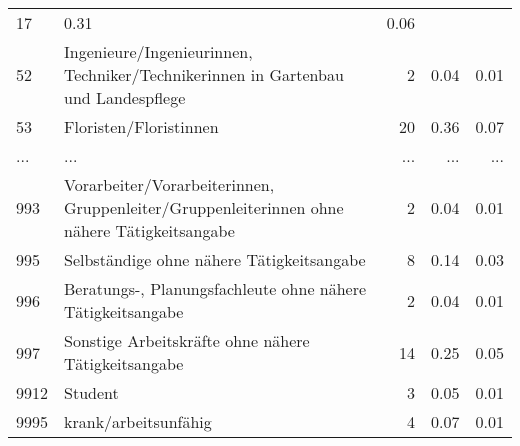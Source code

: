 \begin{longtable}{lXrrr}
          \num{17} &
          \num[round-mode=places,round-precision=2]{0.31} &
          \num[round-mode=places,round-precision=2]{0.06} \\
        52 & \multicolumn{1}{X}{Ingenieure/Ingenieurinnen, Techniker/Technikerinnen in Gartenbau und Landespflege} & %
          \num{2} &
          \num[round-mode=places,round-precision=2]{0.04} &
          \num[round-mode=places,round-precision=2]{0.01} \\
        53 & \multicolumn{1}{X}{Floristen/Floristinnen} & %
          \num{20} &
          \num[round-mode=places,round-precision=2]{0.36} &
          \num[round-mode=places,round-precision=2]{0.07} \\
       ... & ... & ... & ... & ... \\
        993 & \multicolumn{1}{X}{Vorarbeiter/Vorarbeiterinnen, Gruppenleiter/Gruppenleiterinnen ohne nähere Tätigkeitsangabe} & %
          \num{2} &
          \num[round-mode=places,round-precision=2]{0.04} &
          \num[round-mode=places,round-precision=2]{0.01} \\

        995 & \multicolumn{1}{X}{Selbständige ohne nähere Tätigkeitsangabe} & %
          \num{8} &
          \num[round-mode=places,round-precision=2]{0.14} &
          \num[round-mode=places,round-precision=2]{0.03} \\

        996 & \multicolumn{1}{X}{Beratungs-, Planungsfachleute ohne nähere Tätigkeitsangabe} & %
          \num{2} &
          \num[round-mode=places,round-precision=2]{0.04} &
          \num[round-mode=places,round-precision=2]{0.01} \\

        997 & \multicolumn{1}{X}{Sonstige Arbeitskräfte ohne nähere Tätigkeitsangabe} & %
          \num{14} &
          \num[round-mode=places,round-precision=2]{0.25} &
          \num[round-mode=places,round-precision=2]{0.05} \\

        9912 & \multicolumn{1}{X}{Student} & %
          \num{3} &
          \num[round-mode=places,round-precision=2]{0.05} &
          \num[round-mode=places,round-precision=2]{0.01} \\

        9995 & \multicolumn{1}{X}{krank/arbeitsunfähig} & %
          \num{4} &
          \num[round-mode=places,round-precision=2]{0.07} &
          \num[round-mode=places,round-precision=2]{0.01} \\


\end{longtable}
